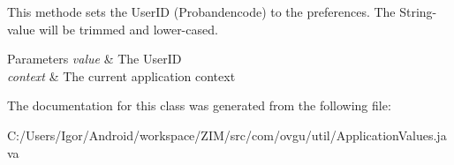 This methode sets the User\-I\-D (Probandencode) to the preferences. The String-\/value will be trimmed and lower-\/cased. 
\begin{DoxyParams}{Parameters}
{\em value} & The User\-I\-D \\
\hline
{\em context} & The current application context \\
\hline
\end{DoxyParams}


The documentation for this class was generated from the following file\-:\begin{DoxyCompactItemize}
\item 
C\-:/\-Users/\-Igor/\-Android/workspace/\-Z\-I\-M/src/com/ovgu/util/Application\-Values.\-java\end{DoxyCompactItemize}
